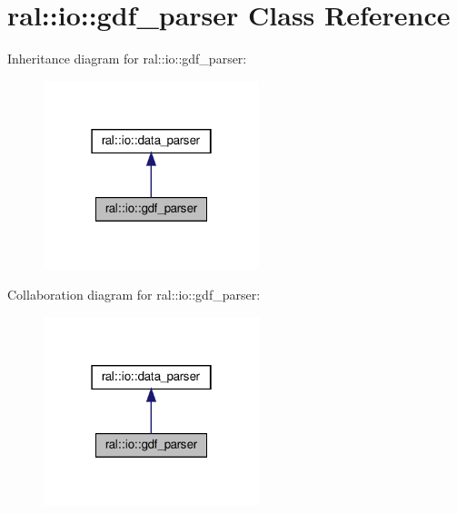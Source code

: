 \hypertarget{classral_1_1io_1_1gdf__parser}{}\section{ral\+:\+:io\+:\+:gdf\+\_\+parser Class Reference}
\label{classral_1_1io_1_1gdf__parser}


Inheritance diagram for ral\+:\+:io\+:\+:gdf\+\_\+parser\+:\nopagebreak
\begin{figure}[H]
\begin{center}
\leavevmode
\includegraphics[width=178pt]{classral_1_1io_1_1gdf__parser__inherit__graph}
\end{center}
\end{figure}


Collaboration diagram for ral\+:\+:io\+:\+:gdf\+\_\+parser\+:\nopagebreak
\begin{figure}[H]
\begin{center}
\leavevmode
\includegraphics[width=178pt]{classral_1_1io_1_1gdf__parser__coll__graph}
\end{center}
\end{figure}
